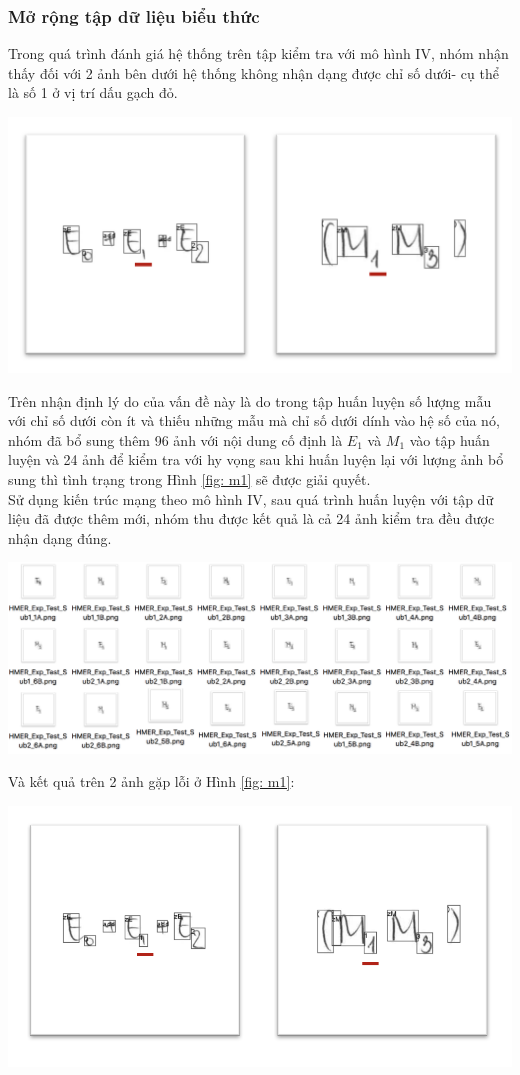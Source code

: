 \documentclass[a4paper,12pt]{article}
\begin{document}
	\subsubsection{Mở rộng tập dữ liệu biểu thức}
	Trong quá trình đánh giá hệ thống trên tập kiểm tra với mô hình IV, nhóm nhận thấy đối với 2 ảnh bên dưới hệ thống không nhận dạng được chỉ số dưới- cụ thể là số 1 ở vị trí dấu gạch đỏ. 
	\begin{center}
		\centering
		\includegraphics[width=0.6\linewidth]{M1E1}
		\vspace{0.5cm}
		\label{fig: m1}
	\end{center}
	Trên nhận định lý do của vấn đề này là do trong tập huấn luyện số lượng mẫu với chỉ số dưới còn ít và thiếu những mẫu mà chỉ số dưới dính vào hệ số của nó, nhóm đã bổ sung thêm 96 ảnh với nội dung cố định là $E_1$ và $M_1$ vào tập huấn luyện và 24 ảnh để kiểm tra với hy vọng sau khi huấn luyện lại với lượng ảnh bổ sung thì tình trạng trong Hình \ref{fig: m1} sẽ được giải quyết.\\
	Sử dụng kiến trúc mạng theo mô hình IV, sau quá trình huấn luyện với tập dữ liệu đã được thêm mới, nhóm thu được kết quả là cả 24 ảnh kiểm tra đều được nhận dạng đúng.
	\vspace{1cm}
	\begin{center}
		\centering
		\includegraphics[width=0.7\linewidth]{subfolder}
		\vspace{0.5cm}
	\end{center}
	Và kết quả trên 2 ảnh gặp lỗi ở Hình \ref{fig: m1}:
	\begin{center}
		\centering
		\includegraphics[width=0.7\linewidth]{M1E1_res}
		\vspace{0.5cm}
	\end{center}
\end{document}
